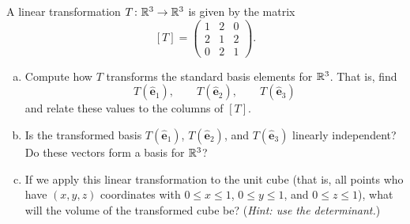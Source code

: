 \documentclass[12pt]{article} %
\newcommand{\ehat}{\boldsymbol{\hat{e}}}
\begin{document}
\newpage
\begin{problem}
A linear transformation $T\colon \mathbb{R}^3 \to \mathbb{R}^3$ is given by the matrix
\[
[T]= \begin{pmatrix}
1& 2& 0\\
2& 1& 2\\
0& 2& 1
\end{pmatrix}.
\]
\begin{enumerate}[(a)]
    \item Compute how $T$ transforms the standard basis elements for $\mathbb{R}^3$. That is, find
    \[
    T(\ehat_1), \qquad
    T(\ehat_2), \qquad
    T(\ehat_3)
    \]
    and relate these values to the columns of $[T]$.
    \item Is the transformed basis $T(\ehat_1)$, $T(\ehat_2)$, and $T(\ehat_3)$ linearly independent? Do these vectors form a basis for $\mathbb{R}^3$?
    \item If we apply this linear transformation to the unit cube (that is, all points who have $(x,y,z)$ coordinates with $0\leq x \leq 1$, $0\leq y \leq 1$, and $0\leq z \leq 1$), what will the volume of the transformed cube be? (\emph{Hint: use the determinant.})
\end{enumerate}
\end{problem}
\end{document}
